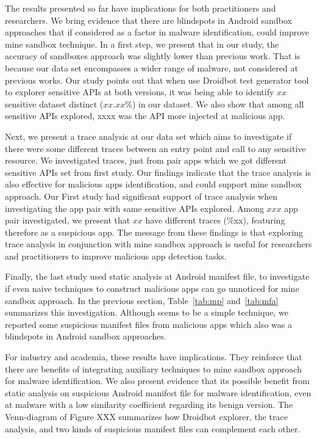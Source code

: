 The results presented so far have implications for both practitioners and researchers. We bring evidence that there are blindspots in Android sandbox approaches that if considered as a factor in malware identification, could improve mine sandbox technique. In a first step, we present that in our study, the accuracy of sandboxes approach was slightly lower than previous work. That is because our data set encompasses a wider range of malware, not considered at previous works. Our study points out that when use Droidbot test generator tool to explorer sensitive APIs at both versions, it was being able to identify $xx$ sensitive dataset distinct ($xx.xx$\%) in our dataset. We also show that among all sensitive APIs explored, xxxx was the API more injected at malicious app.

Next, we present a trace analysis at our data set which aims to investigate if there were some different traces between an entry point and call to any sensitive resource. We investigated traces, just from pair apps which we got different sensitive APIs set from first study. Our findings indicate that the trace analysis is also effective for malicious apps identification, and could support mine sandbox approach. Our First study had significant support of trace analysis when investigating the app pair with same sensitive APIs explored. Among $xxx$ app pair investigated, we present that $xx$ have different traces (\%xx), featuring therefore as a suspicious app. The message from these findings is that exploring trace analysis in conjunction with mine sandbox approach is useful for researchers and practitioners to improve malicious app detection tasks. 

Finally, the last study used static analysis at Android manifest file, to investigate if even naive techniques to construct malicious apps can go unnoticed for mine sandbox approach. In the previous section, Table~\ref{tab:mp} and~\ref{tab:mfa} summarizes this investigation. Although seems to be a simple technique, we reported some suspicious manifest files from malicious apps which also was a blindspots in Android sandbox approaches.

For industry and academia, these results have implications. They reinforce that there are benefits of integrating auxiliary techniques to mine sandbox approach for malware identification. We also present evidence that its possible benefit from static analysis on suspicious Android manifest file for malware identification, even at malware with a low similarity coefficient regarding its benign version. The Venn-diagram of Figure XXX summarizes how Droidbot explorer, the trace analysis, and two kinds of suspicious manifest files can complement each other.
